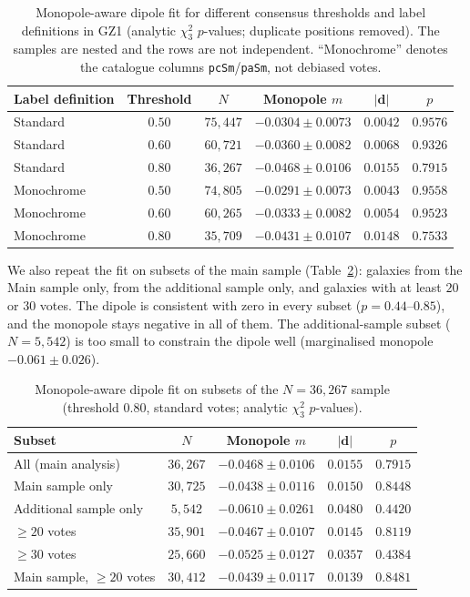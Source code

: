 \documentclass[preprint,12pt]{elsarticle}
\begin{document}
\begin{table}[t]
\caption{\label{tab:robustness}Monopole-aware dipole fit for different consensus thresholds and label definitions in GZ1 (analytic $\chi^2_3$ $p$-values; duplicate positions removed). The samples are nested and the rows are not independent. ``Monochrome'' denotes the catalogue columns \texttt{pcSm}/\texttt{paSm}, not debiased votes.}
\centering
\small
\begin{tabular}{lccccc}
\toprule
Label definition & Threshold & $N$ & Monopole $m$ & $|\mathbf{d}|$ & $p$\\
\midrule
Standard & $0.50$ & $75{,}447$ & $-0.0304\pm0.0073$ & $0.0042$ & $0.9576$\\
Standard & $0.60$ & $60{,}721$ & $-0.0360\pm0.0082$ & $0.0068$ & $0.9326$\\
Standard & $0.80$ & $36{,}267$ & $-0.0468\pm0.0106$ & $0.0155$ & $0.7915$\\
Monochrome & $0.50$ & $74{,}805$ & $-0.0291\pm0.0073$ & $0.0043$ & $0.9558$\\
Monochrome & $0.60$ & $60{,}265$ & $-0.0333\pm0.0082$ & $0.0054$ & $0.9523$\\
Monochrome & $0.80$ & $35{,}709$ & $-0.0431\pm0.0107$ & $0.0148$ & $0.7533$\\
\bottomrule
\end{tabular}
\end{table}

We also repeat the fit on subsets of the main sample (Table~\ref{tab:subsets}): galaxies from the Main sample only, from the additional sample only, and galaxies with at least $20$ or $30$ votes.
The dipole is consistent with zero in every subset ($p=0.44$--$0.85$), and the monopole stays negative in all of them.
The additional-sample subset ($N=5{,}542$) is too small to constrain the dipole well (marginalised monopole $-0.061\pm0.026$).

\begin{table}[t]
\caption{\label{tab:subsets}Monopole-aware dipole fit on subsets of the $N=36{,}267$ sample (threshold $0.80$, standard votes; analytic $\chi^2_3$ $p$-values).}
\centering
\begin{tabular}{lcccc}
\toprule
Subset & $N$ & Monopole $m$ & $|\mathbf{d}|$ & $p$\\
\midrule
All (main analysis) & $36{,}267$ & $-0.0468\pm0.0106$ & $0.0155$ & $0.7915$\\
Main sample only & $30{,}725$ & $-0.0438\pm0.0116$ & $0.0150$ & $0.8448$\\
Additional sample only & $5{,}542$ & $-0.0610\pm0.0261$ & $0.0480$ & $0.4420$\\
$\ge20$ votes & $35{,}901$ & $-0.0467\pm0.0107$ & $0.0145$ & $0.8119$\\
$\ge30$ votes & $25{,}660$ & $-0.0525\pm0.0127$ & $0.0357$ & $0.4384$\\
Main sample, $\ge20$ votes & $30{,}412$ & $-0.0439\pm0.0117$ & $0.0139$ & $0.8481$\\
\bottomrule
\end{tabular}
\end{table}
\end{document}
